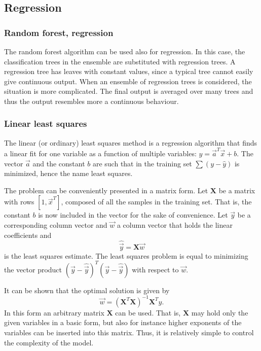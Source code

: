 \documentclass[twoside]{article}
\renewcommand{\v}[1]{\vec{#1}}
\begin{document}
\begin{multicols}{2}
\subsection{Regression}

\subsubsection{Random forest, regression}

The random forest algorithm can be used also for regression. In this case, the classification trees in the 
ensemble are substituted with regression trees. A regression tree has leaves with constant values,
since a typical tree cannot easily give continuous output. When an ensemble of regression trees is considered, the 
situation is more complicated. The final output is averaged over many trees and thus the output resembles
more a continuous behaviour.

\subsubsection{Linear least squares}\label{method:leastsquare}

The linear (or ordinary) least squares method is a regression algorithm that
finds a linear fit for one variable as a function of multiple variables: $\hat{y} = \v{a}^T \v{x}+b$. 
The vector $\v{a}$ and the constant $b$ are such that in the training set $\sum (y - \hat{y})$ is 
minimized, hence the name least squares.

The problem can be conveniently presented in a matrix form. Let $\mathbf{X}$ be a matrix
with rows $[1, \v{x}^T]$, composed of all the samples in the training set. That is, the 
constant $b$ is now included in the vector for the sake of convenience. Let $\v{y}$ be
a corresponding column vector and $\v{w}$ a column vector that holds the linear coefficients and
\begin{equation}
\hat{\v{y}} = \mathbf{X} \v{w}
\end{equation}
is the least squares estimate. The least squares problem is equal to minimizing the
vector product $(\v{y} - \hat{\v{y}})^T(\v{y} - \hat{\v{y}})$ with respect to $\v{w}$. 

It can be shown that the optimal solution is given by 
\begin{equation}
 \v{w} = (\mathbf{X}^T \mathbf{X})^{-1} \mathbf{X}^T y.
\end{equation}
In this form an arbitrary matrix $\mathbf{X}$ can be used. That is,
$\mathbf{X}$ may hold only the given variables in a basic form, but also for instance higher
exponents of the variables can be inserted into this matrix. Thus, it is relatively simple
to control the complexity of the model.


\end{multicols}
\end{document}
